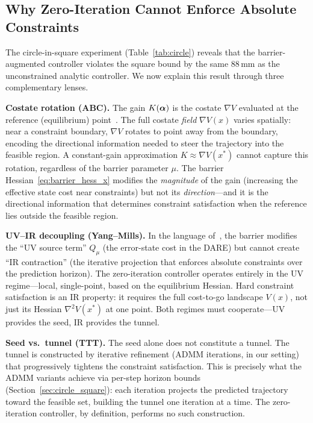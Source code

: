 \subsection{Why Zero-Iteration Cannot Enforce Absolute Constraints}
\label{sec:why_barrier_fails}

The circle-in-square experiment
(Table~\ref{tab:circle}) reveals that the barrier-augmented
controller violates the square bound by the same 88\,mm as the
unconstrained analytic controller.
We now explain this result through three complementary lenses.

\textbf{Costate rotation (ABC).}
The gain $K(\bm{\alpha})$ is the costate $\nabla V$ evaluated at
the reference (equilibrium) point~\cite{zhang2026abc}.
The full costate \emph{field} $\nabla V(x)$ varies spatially:
near a constraint boundary, $\nabla V$ rotates to point
away from the boundary, encoding the directional information
needed to steer the trajectory into the feasible region.
A constant-gain approximation $K \approx \nabla V(x^*)$ cannot
capture this rotation, regardless of the barrier parameter $\mu$.
The barrier Hessian~\eqref{eq:barrier_hess_x} modifies the
\emph{magnitude} of the gain (increasing the effective state cost
near constraints) but not its \emph{direction}---and it is the
directional information that determines constraint satisfaction
when the reference lies outside the feasible region.

\textbf{UV--IR decoupling (Yang--Mills).}
In the language of~\cite{zhang2026ym}, the barrier modifies
the ``UV source term'' $Q_\mu$ (the error-state cost in the
DARE) but cannot create ``IR contraction''
(the iterative projection that enforces absolute constraints
over the prediction horizon).
The zero-iteration controller operates entirely in the UV
regime---local, single-point, based on the equilibrium
Hessian.
Hard constraint satisfaction is an IR property: it requires
the full cost-to-go landscape $V(x)$, not just its Hessian
$\nabla^2 V(x^*)$ at one point.
Both regimes must cooperate---UV provides the seed, IR provides
the tunnel.

\textbf{Seed vs.\ tunnel (TTT).}
The seed alone does not constitute a tunnel.
The tunnel is constructed by iterative refinement
(ADMM iterations, in our setting) that progressively
tightens the constraint satisfaction.
This is precisely what the ADMM variants achieve via per-step
horizon bounds (Section~\ref{sec:circle_square}): each
iteration projects the predicted trajectory toward the
feasible set, building the tunnel one iteration at a time.
The zero-iteration controller, by definition, performs
no such construction.

